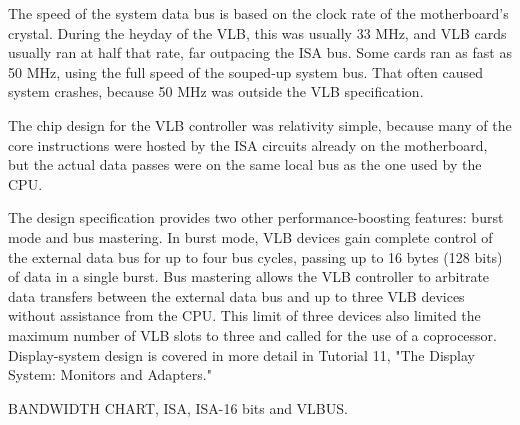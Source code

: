 The speed of the system data bus is based on the clock rate of the motherboard's crystal. During the heyday of the VLB, this was usually 33 MHz, and VLB cards usually ran at half that rate, far outpacing the ISA bus. Some cards ran as fast as 50 MHz, using the full speed of the souped-up system bus. That often caused system crashes, because 50 MHz was outside the VLB specification.\\
\par
The chip design for the VLB controller was relativity simple, because many of the core instructions were hosted by the ISA circuits already on the motherboard, but the actual data passes were on the same local bus as the one used by the CPU.\\
\par
The design specification provides two other performance-boosting features: burst mode and bus mastering. In burst mode, VLB devices gain complete control of the external data bus for up to four bus cycles, passing up to 16 bytes (128 bits) of data in a single burst. Bus mastering allows the VLB controller to arbitrate data transfers between the external data bus and up to three VLB devices without assistance from the CPU. This limit of three devices also limited the maximum number of VLB slots to three and called for the use of a coprocessor. Display-system design is covered in more detail in Tutorial 11, "The Display System: Monitors and Adapters."\\
\par

BANDWIDTH CHART, ISA, ISA-16 bits and VLBUS.